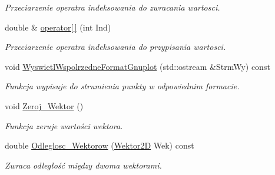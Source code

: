 \begin{DoxyCompactItemize}
\begin{DoxyCompactList}\small\item\em Przeciarzenie operatra indeksowania do zwracania wartosci. \end{DoxyCompactList}\item 
\hypertarget{class_wektor2_d_a1043b8760379f4720ed57913b1241400}{double \& \hyperlink{class_wektor2_d_a1043b8760379f4720ed57913b1241400}{operator\mbox{[}$\,$\mbox{]}} (int Ind)}\label{class_wektor2_d_a1043b8760379f4720ed57913b1241400}

\begin{DoxyCompactList}\small\item\em Przeciarzenie operatra indeksowania do przypisania wartosci. \end{DoxyCompactList}\item 
\hypertarget{class_wektor2_d_a8de4d304d91d4f56eb5d0a8ee4b0f50b}{void \hyperlink{class_wektor2_d_a8de4d304d91d4f56eb5d0a8ee4b0f50b}{Wyswietl\+Wspolrzedne\+Format\+Gnuplot} (std\+::ostream \&Strm\+Wy) const }\label{class_wektor2_d_a8de4d304d91d4f56eb5d0a8ee4b0f50b}

\begin{DoxyCompactList}\small\item\em Funkcja wypisuje do strumienia punkty w odpowiednim formacie. \end{DoxyCompactList}\item 
\hypertarget{class_wektor2_d_ac3e6c9b1be273943e7924e61e8010863}{void \hyperlink{class_wektor2_d_ac3e6c9b1be273943e7924e61e8010863}{Zeroj\+\_\+\+Wektor} ()}\label{class_wektor2_d_ac3e6c9b1be273943e7924e61e8010863}

\begin{DoxyCompactList}\small\item\em Funkcja zeruje wartości wektora. \end{DoxyCompactList}\item 
\hypertarget{class_wektor2_d_ad1a3f748e8d11d80317d9a3dfd42d727}{double \hyperlink{class_wektor2_d_ad1a3f748e8d11d80317d9a3dfd42d727}{Odleglosc\+\_\+\+Wektorow} (\hyperlink{class_wektor2_d}{Wektor2\+D} Wek) const }\label{class_wektor2_d_ad1a3f748e8d11d80317d9a3dfd42d727}

\begin{DoxyCompactList}\small\item\em Zwraca odległość między dwoma wektorami. \end{DoxyCompactList}\end{DoxyCompactItemize}
